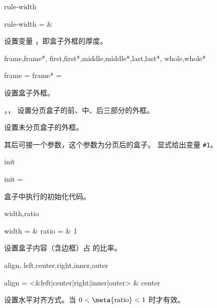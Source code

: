 \documentclass[twoside]{book}
\def\xampletext{\par}
\def\xampleprint{\xamplecode \xampleline \xampletext}
\begin{document}
\begin{keyval}[path=frame]{rule-width}
  \begin{syntax}
    rule-width =  & \V\fboxrule
  \end{syntax}
设置变量 ，即盒子外框的厚度。
\end{keyval}

\begin{keyval}[path=frame]{frame,frame*,
  first,first*,middle,middle*,last,last*,
  whole,whole*}
  \begin{syntax}
    frame  = 
    frame* = 
  \end{syntax}
 设置盒子外框。

，， 设置分页盒子的前、中、后三部分的外框。

 设置未分页盒子的外框。

 其后可接一个参数，这个参数为分页后的盒子。
 显式给出变量 \verb|#1|。
\end{keyval}

\begin{keyval}[path=frame]{init}
  \begin{syntax}
    init = 
  \end{syntax}
盒子中执行的初始化代码。
\end{keyval}

\begin{keyval}[path=frame]{width,ratio}
  \begin{syntax}
    width =  & \V\textwidth
    ratio =  & 1
  \end{syntax}
 设置盒子内容（含边框）占  的比率。
\end{keyval}

\begin{keyval}[path=frame]{align,
  left,center,right,inner,outer}
  \begin{syntax}
    align = <&left|center|right|inner|outer> & center 
  \end{syntax}
设置水平对齐方式。当 $ 0 <{} \text{\meta{ratio}} {}< 1 $ 时才有效。
\end{keyval}

\begin{xample}
\begin{Framed}[ratio=.8,center,
  rule-width=2pt,
  frame={\setlength{\fboxsep}{\whuframesep}%
          \setlength{\fboxrule}{\whuframerule}%
          \fcolorbox{purple}{cyan!50}}]
\zhlipsum[9][name=zhufu]
\end{Framed}
\stopxamplecode
\xampleprint 
\vskip 1pt 
\end{xample}
\end{document}
